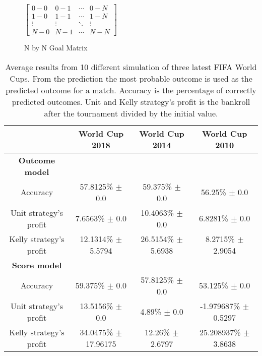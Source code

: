 

\begin{figure}
    $\begin{bmatrix}
    0-0 & 0-1 & \cdots & 0-N \\
    1-0 & 1-1 & \cdots   &1-N \\
    \vdots & \vdots   & \ddots & \vdots \\
    N-0 & N-1 & \cdots & N-N\end{bmatrix}$
\caption{N by N Goal Matrix}
\end{figure}

\begin{sidewaystable}
    \caption{Average results from 10 different simulation of three latest FIFA World Cups. From the prediction the most probable outcome is used as the predicted outcome for a match. Accuracy is the percentage of correctly predicted outcomes. Unit and Kelly strategy's profit is the bankroll after the tournament divided by the initial value.}
    \begin{tabular}{ | c |c| c | c |}
    \hline
    & World Cup 2018 & World Cup 2014 & World Cup 2010 \\
    \hline
    \textbf{Outcome model} \\
    \hline
    Accuracy & 57.8125\% $\pm$ 0.0 & 59.375\% $\pm$  0.0 & 56.25\% $\pm$ 0.0 \\
    Unit strategy's profit& 7.6563\% $\pm$ 0.0 & 10.4063\% $\pm$ 0.0 & 6.8281\% $\pm$ 0.0 \\
    Kelly strategy's profit& 12.1314\% $\pm$ 5.5794 & 26.5154\% $\pm$ 5.6938 & 8.2715\% $\pm$ 2.9054 \\
    \hline
    \textbf{Score model} \\
    \hline
    Accuracy & 59.375\% $\pm$ 0.0 & 57.8125\% $\pm$ 0.0 & 53.125\% $\pm$ 0.0 \\
    Unit strategy's profit & 13.5156\% $\pm$ 0.0 & 4.89\%  $\pm$ 0.0 & -1.979687\% $\pm$ 0.5297 \\
    Kelly strategy's profit & 34.0475\% $\pm$ 17.96175 & 12.26\% $\pm$ 2.6797 & 25.208937\% $\pm$ 3.8638 \\
    \hline
   \end{tabular}
\end{sidewaystable}

